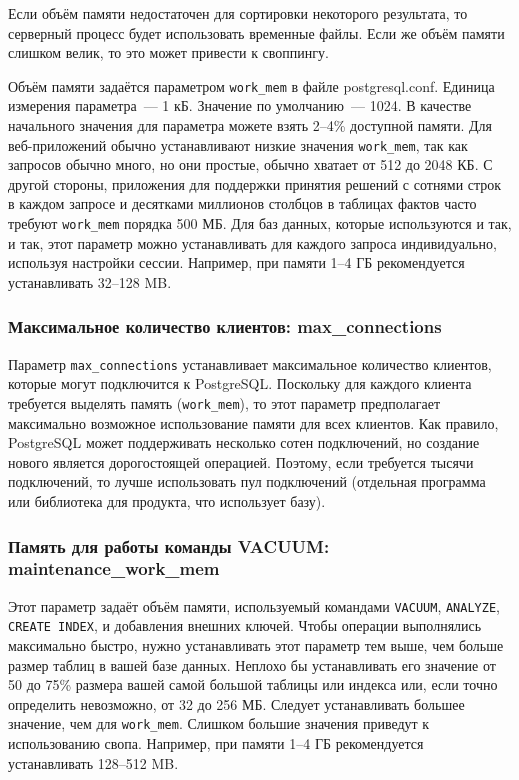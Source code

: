 Если объём памяти недостаточен для сортировки некоторого результата, то серверный процесс будет использовать временные файлы. Если же объём памяти слишком велик, то это может привести к своппингу.

Объём памяти задаётся параметром \lstinline!work_mem! в файле postgresql.conf. Единица измерения параметра~--- 1 кБ. Значение по умолчанию~--- 1024. В качестве начального значения для параметра можете взять 2--4\% доступной памяти. Для веб-приложений обычно устанавливают низкие значения \lstinline!work_mem!, так как запросов обычно много, но они простые, обычно хватает от 512 до 2048 КБ. С другой стороны, приложения для поддержки принятия решений с сотнями строк в каждом запросе и десятками миллионов столбцов в таблицах фактов часто требуют \lstinline!work_mem! порядка 500 МБ. Для баз данных, которые используются и так, и так, этот параметр можно устанавливать для каждого запроса индивидуально, используя настройки сессии. Например, при памяти 1--4 ГБ рекомендуется устанавливать 32--128 MB.


\subsubsection{Максимальное количество клиентов: max\_connections}


Параметр \lstinline!max_connections! устанавливает максимальное количество клиентов, которые могут подключится к PostgreSQL. Поскольку для каждого клиента требуется выделять память (\lstinline!work_mem!), то этот параметр предполагает максимально возможное использование памяти для всех клиентов. Как правило, PostgreSQL может поддерживать несколько сотен подключений, но создание нового является дорогостоящей операцией. Поэтому, если требуется тысячи подключений, то лучше использовать пул подключений (отдельная программа или библиотека для продукта, что использует базу).


\subsubsection{Память для работы команды VACUUM: maintenance\_work\_mem}


Этот параметр задаёт объём памяти, используемый командами \lstinline!VACUUM!, \lstinline!ANALYZE!, \lstinline!CREATE INDEX!, и добавления внешних ключей. Чтобы операции выполнялись максимально быстро, нужно устанавливать этот параметр тем выше, чем больше размер таблиц в вашей базе данных. Неплохо бы устанавливать его значение от 50 до 75\% размера вашей самой большой таблицы или индекса или, если точно определить невозможно, от 32 до 256 МБ. Следует устанавливать большее значение, чем для \lstinline!work_mem!. Слишком большие значения приведут к использованию свопа. Например, при памяти 1--4 ГБ рекомендуется устанавливать 128--512 MB.


